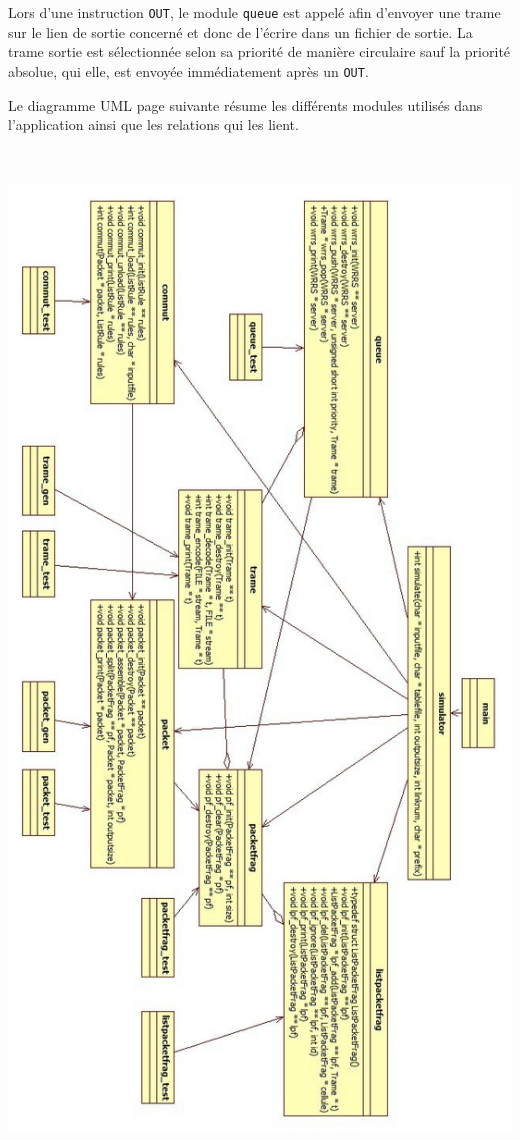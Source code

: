 \documentclass[a4paper,11pt]{article}
\begin{document}
Lors d'une instruction \texttt{OUT}, le module \texttt{queue} est appelé
afin d'envoyer une trame sur le lien de sortie concerné et donc de
l'écrire dans un fichier de sortie. La trame sortie est sélectionnée
selon sa priorité de manière circulaire sauf la priorité absolue, qui
elle, est envoyée immédiatement après un \texttt{OUT}.

Le diagramme UML page suivante résume les différents modules utilisés
dans l'application ainsi que les relations qui les lient.

\includegraphics[height=27cm]{UML.jpg}
\end{document}
